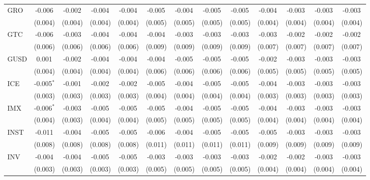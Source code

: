 \begin{table}[!htbp]
\begin{tabular}{@{\extracolsep{5pt}}lcccccccccccc}
 GRO & -0.006$^{}$ & -0.002$^{}$ & -0.004$^{}$ & -0.004$^{}$ & -0.005$^{}$ & -0.004$^{}$ & -0.005$^{}$ & -0.005$^{}$ & -0.004$^{}$ & -0.003$^{}$ & -0.003$^{}$ & -0.003$^{}$ \\
  & (0.004) & (0.004) & (0.004) & (0.004) & (0.005) & (0.005) & (0.005) & (0.005) & (0.004) & (0.004) & (0.004) & (0.004) \\
 GTC & -0.006$^{}$ & -0.003$^{}$ & -0.004$^{}$ & -0.004$^{}$ & -0.004$^{}$ & -0.003$^{}$ & -0.003$^{}$ & -0.003$^{}$ & -0.003$^{}$ & -0.002$^{}$ & -0.002$^{}$ & -0.002$^{}$ \\
  & (0.006) & (0.006) & (0.006) & (0.006) & (0.009) & (0.009) & (0.009) & (0.009) & (0.007) & (0.007) & (0.007) & (0.007) \\
 GUSD & 0.001$^{}$ & -0.002$^{}$ & -0.004$^{}$ & -0.004$^{}$ & -0.004$^{}$ & -0.005$^{}$ & -0.005$^{}$ & -0.005$^{}$ & -0.002$^{}$ & -0.003$^{}$ & -0.003$^{}$ & -0.003$^{}$ \\
  & (0.004) & (0.004) & (0.004) & (0.004) & (0.006) & (0.006) & (0.006) & (0.006) & (0.005) & (0.005) & (0.005) & (0.005) \\
 ICE & -0.005$^{*}$ & -0.001$^{}$ & -0.002$^{}$ & -0.002$^{}$ & -0.005$^{}$ & -0.004$^{}$ & -0.005$^{}$ & -0.005$^{}$ & -0.004$^{}$ & -0.003$^{}$ & -0.003$^{}$ & -0.003$^{}$ \\
  & (0.003) & (0.003) & (0.003) & (0.003) & (0.004) & (0.004) & (0.004) & (0.004) & (0.003) & (0.003) & (0.003) & (0.003) \\
 IMX & -0.006$^{*}$ & -0.003$^{}$ & -0.005$^{}$ & -0.005$^{}$ & -0.005$^{}$ & -0.004$^{}$ & -0.005$^{}$ & -0.005$^{}$ & -0.004$^{}$ & -0.003$^{}$ & -0.003$^{}$ & -0.003$^{}$ \\
  & (0.004) & (0.003) & (0.004) & (0.004) & (0.005) & (0.005) & (0.005) & (0.005) & (0.004) & (0.004) & (0.004) & (0.004) \\
 INST & -0.011$^{}$ & -0.004$^{}$ & -0.005$^{}$ & -0.005$^{}$ & -0.006$^{}$ & -0.004$^{}$ & -0.005$^{}$ & -0.005$^{}$ & -0.005$^{}$ & -0.003$^{}$ & -0.003$^{}$ & -0.003$^{}$ \\
  & (0.008) & (0.008) & (0.008) & (0.008) & (0.011) & (0.011) & (0.011) & (0.011) & (0.009) & (0.009) & (0.009) & (0.009) \\
 INV & -0.004$^{}$ & -0.004$^{}$ & -0.005$^{}$ & -0.005$^{}$ & -0.003$^{}$ & -0.003$^{}$ & -0.003$^{}$ & -0.003$^{}$ & -0.002$^{}$ & -0.002$^{}$ & -0.003$^{}$ & -0.003$^{}$ \\
  & (0.003) & (0.003) & (0.003) & (0.003) & (0.005) & (0.005) & (0.005) & (0.005) & (0.004) & (0.004) & (0.004) & (0.004) \\

\end{tabular}
\end{table}

